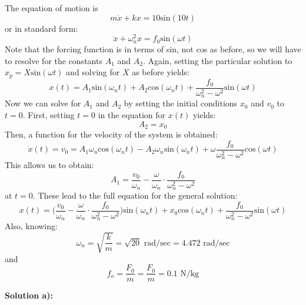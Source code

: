 \documentclass[12pt,letter]{article}
\begin{document}
\begin{example}
	\noindent
	The equation of motion is
	\begin{equation}
		m\ddot{x}+kx=10\text{sin}(10t)
	\end{equation}
	or in standard form:
	\begin{equation}
		\ddot{x}+\omega_n^2x=f_0\text{sin}(\omega t)
	\end{equation}							
	Note that the forcing function is in terms of sin, not cos as before, so we will have to resolve for the constants $A_1$ and $A_2$. Again, setting the particular solution to $x_p=X\text{sin}(\omega t)$ and solving for $X$ as before yields:
	\begin{equation}
		x(t) = A_1\text{sin}(\omega_n t) + A_2\text{cos}(\omega_n t) + \frac{f_0}{\omega_n^2-\omega^2}\text{sin}(\omega t)
	\end{equation}	
	Now we can solve for $A_1$ and $A_2$ by setting the initial conditions $x_0$ and $v_0$ to $t=0$. First, setting $t=0$ in the equation for $x(t)$ yields:
	\begin{equation}
		A_2 = x_0
	\end{equation}	
	Then, a function for the velocity of the system is obtained: 
	\begin{equation}
		\dot{x}(t) = v_0 = A_1\omega_n\text{cos}(\omega_n t) - A_2\omega_n\text{sin}(\omega_n t) + \omega\frac{f_0}{\omega_n^2-\omega^2}\text{cos}(\omega t)
	\end{equation}				
	This allows us to obtain:
	\begin{equation}
		A_1 = \frac{v_0}{\omega_n}-\frac{\omega}{\omega_n}\cdot \frac{f_0}{\omega_n^2-\omega^2}
	\end{equation}	
	at $t=0$. These lead to the full equation for the general solution:
	\begin{equation}
		x(t) = \Big(\frac{v_0}{\omega_n}-\frac{\omega}{\omega_n}\cdot \frac{f_0}{\omega_n^2-\omega^2}\Big)\text{sin}(\omega_n t) + x_0\text{cos}(\omega_n t) + \frac{f_0}{\omega_n^2-\omega^2}\text{sin}(\omega t)
	\end{equation}								
	Also, knowing:
	\begin{equation}
		\omega_n = \sqrt{\frac{k}{m}} = \sqrt{20} \text{~rad/sec} =  4.472 \text{~rad/sec}
	\end{equation}				
	and
	\begin{equation}
		f_o = \frac{F_0}{m} = \frac{F_0}{m} = 0.1 \text{ N/kg}
	\end{equation}	

	\noindent\textbf{Solution a):} 


\end{example}
\end{document}
